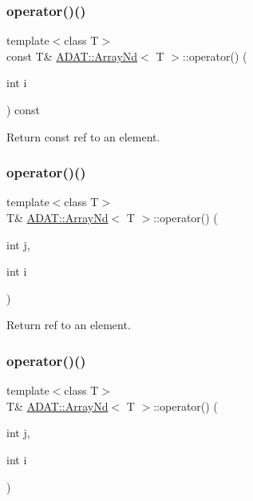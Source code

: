 \subsubsection{\texorpdfstring{operator()()}{operator()()}\hspace{0.1cm}{\footnotesize\ttfamily [4/16]}}
{\footnotesize\ttfamily template$<$class T$>$ \\
const T\& \mbox{\hyperlink{classADAT_1_1ArrayNd}{A\+D\+A\+T\+::\+Array\+Nd}}$<$ T $>$\+::operator() (\begin{DoxyParamCaption}\item[{int}]{i }\end{DoxyParamCaption}) const\hspace{0.3cm}{\ttfamily [inline]}}



Return const ref to an element. 

\mbox{\label{classADAT_1_1ArrayNd_a935f9f5199e47612b81056ac7b654c24}} 
\subsubsection{\texorpdfstring{operator()()}{operator()()}\hspace{0.1cm}{\footnotesize\ttfamily [5/16]}}
{\footnotesize\ttfamily template$<$class T$>$ \\
T\& \mbox{\hyperlink{classADAT_1_1ArrayNd}{A\+D\+A\+T\+::\+Array\+Nd}}$<$ T $>$\+::operator() (\begin{DoxyParamCaption}\item[{int}]{j,  }\item[{int}]{i }\end{DoxyParamCaption})\hspace{0.3cm}{\ttfamily [inline]}}



Return ref to an element. 

\mbox{\label{classADAT_1_1ArrayNd_a935f9f5199e47612b81056ac7b654c24}} 
\subsubsection{\texorpdfstring{operator()()}{operator()()}\hspace{0.1cm}{\footnotesize\ttfamily [6/16]}}
{\footnotesize\ttfamily template$<$class T$>$ \\
T\& \mbox{\hyperlink{classADAT_1_1ArrayNd}{A\+D\+A\+T\+::\+Array\+Nd}}$<$ T $>$\+::operator() (\begin{DoxyParamCaption}\item[{int}]{j,  }\item[{int}]{i }\end{DoxyParamCaption})\hspace{0.3cm}{\ttfamily [inline]}}




